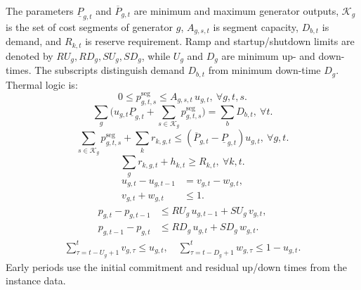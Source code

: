 \documentclass[runningheads]{llncs}
\begin{document}
The parameters $\underline{P}_{g,t}$ and $\overline{P}_{g,t}$ are minimum and maximum generator outputs, $\mathcal{K}_g$ is the set of cost segments of generator $g$, $A_{g,s,t}$ is segment capacity, $D_{b,t}$ is demand, and $R_{k,t}$ is reserve requirement. Ramp and startup/shutdown limits are denoted by $RU_g,RD_g,SU_g,SD_g$, while $U_g$ and $D_g$ are minimum up- and down-times. The subscripts distinguish demand $D_{b,t}$ from minimum down-time $D_g$. Thermal logic is:
\begin{equation}
0\le p^{\mathrm{seg}}_{g,t,s} \le A_{g,s,t}\,u_{g,t}, \ \forall g,t,s. \label{eq:seg-link}
\end{equation}
\begin{equation}
\sum_{g}\Big(u_{g,t}\underline{P}_{g,t}+\sum_{s\in \mathcal{K}_g}p^{\mathrm{seg}}_{g,t,s}\Big)=\sum_{b}D_{b,t}, \ \forall t. \label{eq:balance}
\end{equation}
\begin{equation}
\sum_{s\in \mathcal{K}_g}p^{\mathrm{seg}}_{g,t,s}+\sum_{k}r_{k,g,t}\le (\overline{P}_{g,t}-\underline{P}_{g,t})u_{g,t}, \ \forall g,t. \label{eq:res-head}
\end{equation}
\begin{equation}
\sum_{g}r_{k,g,t} + h_{k,t} \ge R_{k,t}, \ \forall k,t. \label{eq:res-req}
\end{equation}
\begin{align}
u_{g,t}-u_{g,t-1} &= v_{g,t}-w_{g,t}, \label{eq:su-def}\\
v_{g,t}+w_{g,t} &\le 1. \label{eq:su-excl}
\end{align}
\begin{align}
p_{g,t}-p_{g,t-1} &\le RU_g\,u_{g,t-1} + SU_g\,v_{g,t}, \label{eq:ramp-up}\\
p_{g,t-1}-p_{g,t} &\le RD_g\,u_{g,t} + SD_g\,w_{g,t}. \label{eq:ramp-dn}
\end{align}
\begin{align}
\sum_{\tau=t-U_g+1}^{t} v_{g,\tau} \le u_{g,t}, \quad
\sum_{\tau=t-D_g+1}^{t} w_{g,\tau} \le 1-u_{g,t}. \label{eq:min-ud}
\end{align}
Early periods use the initial commitment and residual up/down times from the instance data.
\end{document}
